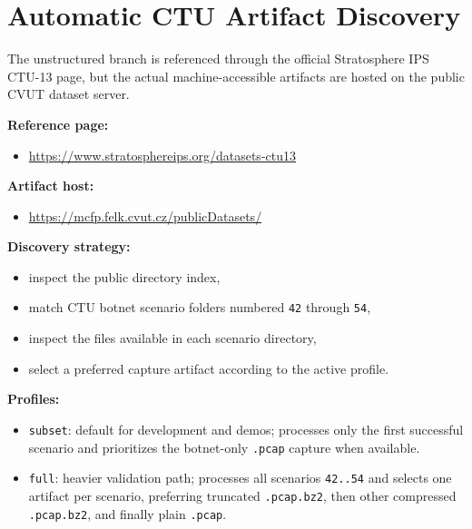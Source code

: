 \documentclass[11pt,a4paper]{article}
\begin{document}
\section{Automatic CTU Artifact Discovery}
The unstructured branch is referenced through the official Stratosphere IPS CTU-13 page, but the actual machine-accessible artifacts are hosted on the public CVUT dataset server.

\textbf{Reference page:}
\begin{itemize}[leftmargin=1.5em]
  \item \url{https://www.stratosphereips.org/datasets-ctu13}
\end{itemize}

\textbf{Artifact host:}
\begin{itemize}[leftmargin=1.5em]
  \item \url{https://mcfp.felk.cvut.cz/publicDatasets/}
\end{itemize}

\textbf{Discovery strategy:}
\begin{itemize}[leftmargin=1.5em]
  \item inspect the public directory index,
  \item match CTU botnet scenario folders numbered \texttt{42} through \texttt{54},
  \item inspect the files available in each scenario directory,
  \item select a preferred capture artifact according to the active profile.
\end{itemize}

\textbf{Profiles:}
\begin{itemize}[leftmargin=1.5em]
  \item \texttt{subset}: default for development and demos; processes only the first successful scenario and prioritizes the botnet-only \texttt{.pcap} capture when available.
  \item \texttt{full}: heavier validation path; processes all scenarios \texttt{42..54} and selects one artifact per scenario, preferring truncated \texttt{.pcap.bz2}, then other compressed \texttt{.pcap.bz2}, and finally plain \texttt{.pcap}.
\end{itemize}
\end{document}
